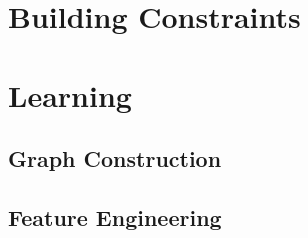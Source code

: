 \section{Building  Constraints}\label{sec:i-training-crfs}

\section{Learning }\label{sec:i-learning-crfs}

\subsection{Graph Construction}\label{subsec:i-graph-construction}

\subsection{Feature Engineering}\label{subsec:i-feature-engineering}
